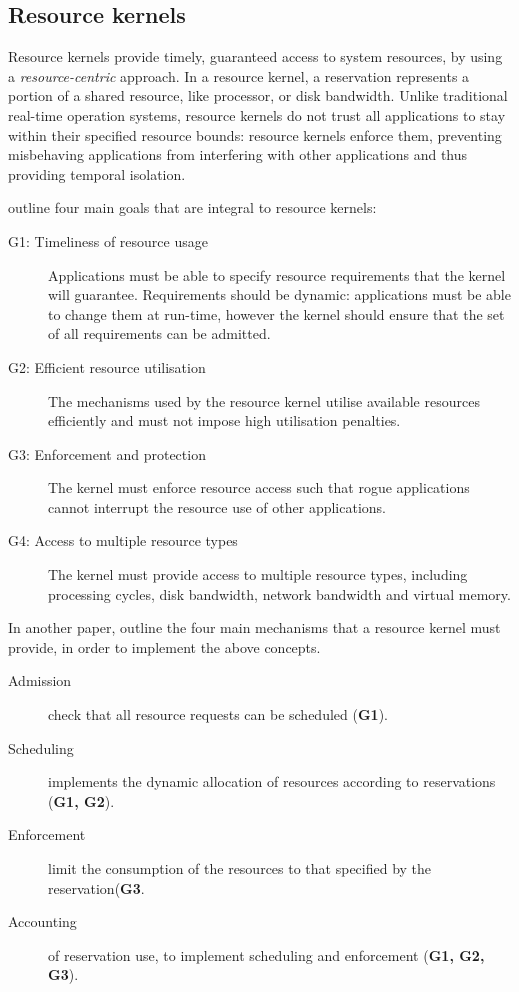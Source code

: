 \subsection{Resource kernels}
\label{sec:resource-kernels}

Resource kernels provide timely, guaranteed access to system resources, by using a \emph{resource-centric} approach.
In a resource kernel, a reservation represents a portion of a shared resource, like processor, or disk bandwidth.
Unlike traditional real-time operation systems, resource kernels do not trust all applications to stay within their specified resource bounds: resource kernels enforce them, preventing misbehaving applications from interfering with other applications and thus providing temporal isolation.

\citet{Rajkumar_JMO_98} outline four main goals that are integral to resource kernels:
\begin{description}
	\item[G1: Timeliness of resource usage] Applications must be able to specify resource requirements that the kernel will guarantee.
	Requirements should be dynamic: applications must be able to change them at run-time, however the kernel should ensure that the set of all requirements can be admitted.
\item[G2: Efficient resource utilisation] The mechanisms used by the resource kernel utilise available resources efficiently and must not impose high utilisation penalties.
\item[G3: Enforcement and protection] The kernel must enforce resource access such that rogue applications cannot interrupt the resource use of other applications.
\item[G4: Access to multiple resource types] The kernel must provide access to multiple resource types, including processing cycles, disk bandwidth, network bandwidth and virtual memory.
\end{description}

In another paper, \citet{deNiz_LSR_01} outline the four main mechanisms that a resource kernel must provide, in order to implement the above concepts.

\begin{description}
	\item[Admission] check that all resource requests can be scheduled (\textbf{G1}).
	\item[Scheduling] implements the dynamic allocation of resources according to reservations (\textbf{G1, G2}).
	\item[Enforcement] limit the consumption of the resources to that specified by the reservation(\textbf{G3}.
	\item[Accounting] of reservation use, to implement scheduling and enforcement (\textbf{G1, G2, G3}).
\end{description}

